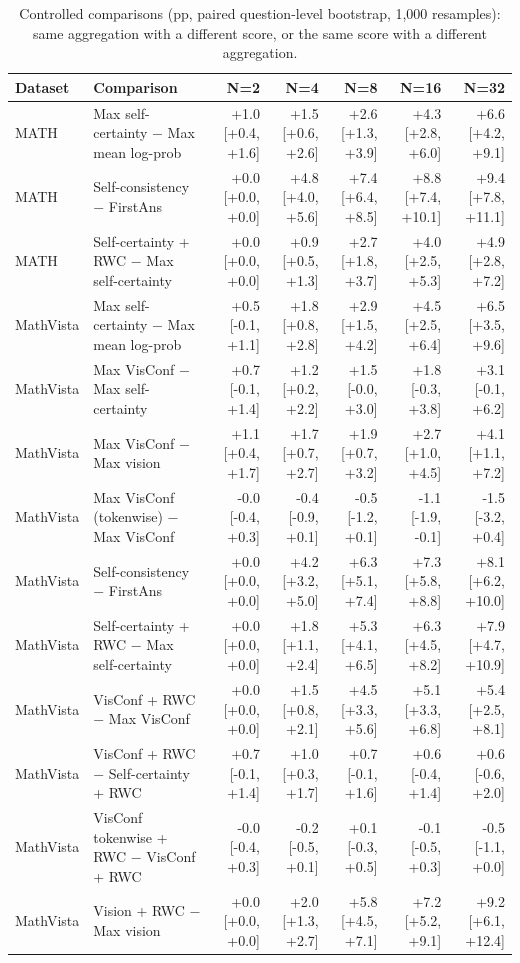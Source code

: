 \begin{table}[t]
\centering
\small
\caption{Controlled comparisons (pp, paired question-level bootstrap, 1,000 resamples): same aggregation with a different score, or the same score with a different aggregation.}
\label{tab:t3-boot}
\begin{tabular}{llrrrrr}
\toprule
Dataset & Comparison & N=2 & N=4 & N=8 & N=16 & N=32 \\
\midrule
MATH & Max self-certainty $-$ Max mean log-prob & +1.0 [+0.4, +1.6] & +1.5 [+0.6, +2.6] & +2.6 [+1.3, +3.9] & +4.3 [+2.8, +6.0] & +6.6 [+4.2, +9.1] \\
MATH & Self-consistency $-$ FirstAns & +0.0 [+0.0, +0.0] & +4.8 [+4.0, +5.6] & +7.4 [+6.4, +8.5] & +8.8 [+7.4, +10.1] & +9.4 [+7.8, +11.1] \\
MATH & Self-certainty + RWC $-$ Max self-certainty & +0.0 [+0.0, +0.0] & +0.9 [+0.5, +1.3] & +2.7 [+1.8, +3.7] & +4.0 [+2.5, +5.3] & +4.9 [+2.8, +7.2] \\
MathVista & Max self-certainty $-$ Max mean log-prob & +0.5 [-0.1, +1.1] & +1.8 [+0.8, +2.8] & +2.9 [+1.5, +4.2] & +4.5 [+2.5, +6.4] & +6.5 [+3.5, +9.6] \\
MathVista & Max VisConf $-$ Max self-certainty & +0.7 [-0.1, +1.4] & +1.2 [+0.2, +2.2] & +1.5 [-0.0, +3.0] & +1.8 [-0.3, +3.8] & +3.1 [-0.1, +6.2] \\
MathVista & Max VisConf $-$ Max vision & +1.1 [+0.4, +1.7] & +1.7 [+0.7, +2.7] & +1.9 [+0.7, +3.2] & +2.7 [+1.0, +4.5] & +4.1 [+1.1, +7.2] \\
MathVista & Max VisConf (tokenwise) $-$ Max VisConf & -0.0 [-0.4, +0.3] & -0.4 [-0.9, +0.1] & -0.5 [-1.2, +0.1] & -1.1 [-1.9, -0.1] & -1.5 [-3.2, +0.4] \\
MathVista & Self-consistency $-$ FirstAns & +0.0 [+0.0, +0.0] & +4.2 [+3.2, +5.0] & +6.3 [+5.1, +7.4] & +7.3 [+5.8, +8.8] & +8.1 [+6.2, +10.0] \\
MathVista & Self-certainty + RWC $-$ Max self-certainty & +0.0 [+0.0, +0.0] & +1.8 [+1.1, +2.4] & +5.3 [+4.1, +6.5] & +6.3 [+4.5, +8.2] & +7.9 [+4.7, +10.9] \\
MathVista & VisConf + RWC $-$ Max VisConf & +0.0 [+0.0, +0.0] & +1.5 [+0.8, +2.1] & +4.5 [+3.3, +5.6] & +5.1 [+3.3, +6.8] & +5.4 [+2.5, +8.1] \\
MathVista & VisConf + RWC $-$ Self-certainty + RWC & +0.7 [-0.1, +1.4] & +1.0 [+0.3, +1.7] & +0.7 [-0.1, +1.6] & +0.6 [-0.4, +1.4] & +0.6 [-0.6, +2.0] \\
MathVista & VisConf tokenwise + RWC $-$ VisConf + RWC & -0.0 [-0.4, +0.3] & -0.2 [-0.5, +0.1] & +0.1 [-0.3, +0.5] & -0.1 [-0.5, +0.3] & -0.5 [-1.1, +0.0] \\
MathVista & Vision + RWC $-$ Max vision & +0.0 [+0.0, +0.0] & +2.0 [+1.3, +2.7] & +5.8 [+4.5, +7.1] & +7.2 [+5.2, +9.1] & +9.2 [+6.1, +12.4] \\
\bottomrule
\end{tabular}
\end{table}
